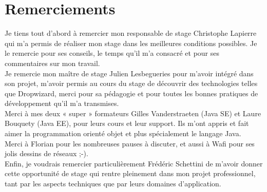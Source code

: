 \chapter*{Remerciements}


Je tiens tout d’abord à remercier mon responsable de stage Christophe Lapierre qui m’a permis de réaliser mon stage dans les meilleures conditions possibles. 
Je le remercie pour ses conseils, le temps qu’il m’a consacré et pour ses commentaires sur mon travail. \\

Je remercie mon maître de stage Julien Lesbegueries pour m'avoir intégré dans son projet, m'avoir permis au cours du stage de découvrir des technologies telles que Dropwizard, merci pour sa pédagogie et pour toutes les bonnes pratiques de développement qu'il m'a transmises.\\

Merci à mes deux « super » formateurs Gilles Vanderstraeten (Java SE) et Laure Bouquety (Java EE), pour leurs cours et leur support. Ils m'ont appris et fait aimer la programmation orienté objet et plus spécialement le langage Java. \\

Merci à Florian pour les nombreuses pauses à discuter, et aussi à Wafi pour ses jolis dessins de réseaux ;-).\\

Enfin, je voudrais remercier particulièrement Frédéric Schettini de m’avoir donner cette opportunité de stage qui rentre pleinement dans mon projet professionnel, tant par les aspects techniques que par leurs domaines d'application. \\
